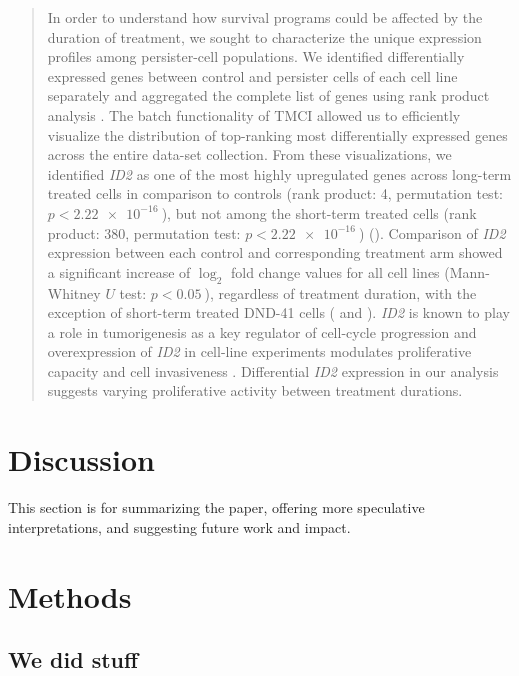 \begin{refsegment}
\begin{quote}
In order to understand how survival programs could be affected by the duration
of treatment, we sought to characterize the unique expression profiles among
persister-cell populations. We identified differentially expressed genes between
control and persister cells of each cell line separately and aggregated the
complete list of genes using rank product analysis
\autocite{breitlingFEBSLetters2004}. The batch functionality of TMCI allowed us
to efficiently visualize the distribution of top-ranking most differentially
expressed genes across the entire data-set collection. From these
visualizations, we identified \textit{ID2} as one of the most highly upregulated
genes across long-term treated cells in comparison to controls (rank product: 4,
permutation test: \(p < \SI{2.22e-16}{}\)), but not among the short-term treated
cells (rank product: 380, permutation test: \(p < \SI{2.22e-16}{}\))
(). Comparison of
  \textit{ID2} expression between each control and corresponding treatment arm
  showed a significant increase of \(\log_2\) fold change values for all cell
  lines (Mann-Whitney \(U\) test: \(p < \SI{0.05}{}\)), regardless of treatment
  duration, with the exception of short-term treated DND-41 cells
  ( and ). \textit{ID2} is known to play
  a role in tumorigenesis as a key regulator of cell-cycle progression and
  overexpression of \textit{ID2} in cell-line experiments modulates
  proliferative capacity and cell invasiveness \autocite{itahana_role_2003,
    stighall_high_2005}. Differential \textit{ID2} expression in our analysis
  suggests varying proliferative activity between treatment durations.
\end{quote}

\section*{Discussion}

This section is for summarizing the paper, offering more speculative
interpretations, and suggesting future work and impact.

\section*{Methods}

\subsection*{We did stuff}


\end{refsegment}
